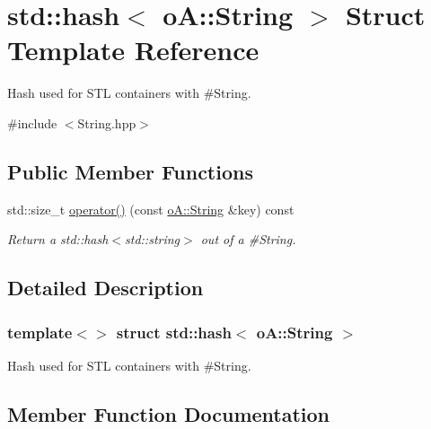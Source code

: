 \hypertarget{structstd_1_1hash_3_01o_a_1_1_string_01_4}{}\section{std\+:\+:hash$<$ oA\+:\+:String $>$ Struct Template Reference}
\label{structstd_1_1hash_3_01o_a_1_1_string_01_4}


Hash used for S\+TL containers with \#\+String.  




{\ttfamily \#include $<$String.\+hpp$>$}

\subsection*{Public Member Functions}
\begin{DoxyCompactItemize}
\item 
std\+::size\+\_\+t \mbox{\hyperlink{structstd_1_1hash_3_01o_a_1_1_string_01_4_a6e23a430fd8bccdc9acf379573e16403}{operator()}} (const \mbox{\hyperlink{classo_a_1_1_string}{o\+A\+::\+String}} \&key) const
\begin{DoxyCompactList}\small\item\em Return a std\+::hash$<$std\+::string$>$ out of a \#\+String. \end{DoxyCompactList}\end{DoxyCompactItemize}


\subsection{Detailed Description}
\subsubsection*{template$<$$>$\newline
struct std\+::hash$<$ o\+A\+::\+String $>$}

Hash used for S\+TL containers with \#\+String. 

\subsection{Member Function Documentation}
\mbox{\label{structstd_1_1hash_3_01o_a_1_1_string_01_4_a6e23a430fd8bccdc9acf379573e16403}} 
